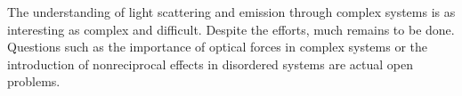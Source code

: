 The understanding of light scattering and emission through complex systems is as interesting as complex and difficult. Despite the efforts, much remains to be done. Questions such as the importance of optical forces in complex systems or the introduction of nonreciprocal effects in disordered systems are actual open problems.
